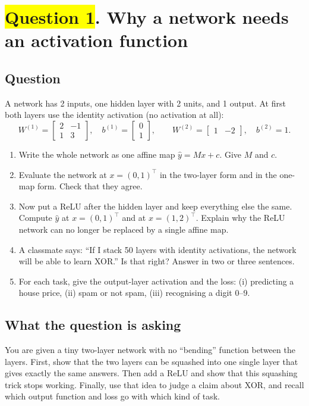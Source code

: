 \documentclass[12pt,a4paper]{article}
\newcommand{\hlq}[1]{{\setlength{\fboxsep}{1.5pt}\colorbox{yellow}{#1}}}
\begin{document}
\section[Question 1. Why a network needs an activation function]{\hlq{Question 1}. Why a network needs an activation function}
\subsection*{Question}
A network has 2 inputs, one hidden layer with 2 units, and 1 output. At first both layers use the identity activation (no activation at all):
\[
W^{(1)}=\begin{bmatrix}2&-1\\1&3\end{bmatrix},\quad b^{(1)}=\begin{bmatrix}0\\1\end{bmatrix},\qquad
W^{(2)}=\begin{bmatrix}1&-2\end{bmatrix},\quad b^{(2)}=1 .
\]
\begin{enumerate}[label=(\alph*)]
\item[\hlq{(a)}] Write the whole network as one affine map $\hat y = Mx + c$. Give $M$ and $c$.
\item[(b)] Evaluate the network at $x=(0,1)^\top$ in the two-layer form and in the one-map form. Check that they agree.
\item[(c)] Now put a ReLU after the hidden layer and keep everything else the same. Compute $\hat y$ at $x=(0,1)^\top$ and at $x=(1,2)^\top$. Explain why the ReLU network can no longer be replaced by a single affine map.
\item[\hlq{(d)}] A classmate says: ``If I stack 50 layers with identity activations, the network will be able to learn XOR.'' Is that right? Answer in two or three sentences.
\item[\hlq{(e)}] For each task, give the output-layer activation and the loss: (i) predicting a house price, (ii) spam or not spam, (iii) recognising a digit 0--9.
\end{enumerate}

\subsection*{What the question is asking}
You are given a tiny two-layer network with no ``bending'' function between the layers. First, show that the two layers can be squashed into one single layer that gives exactly the same answers. Then add a ReLU and show that this squashing trick stops working. Finally, use that idea to judge a claim about XOR, and recall which output function and loss go with which kind of task.
\end{document}
